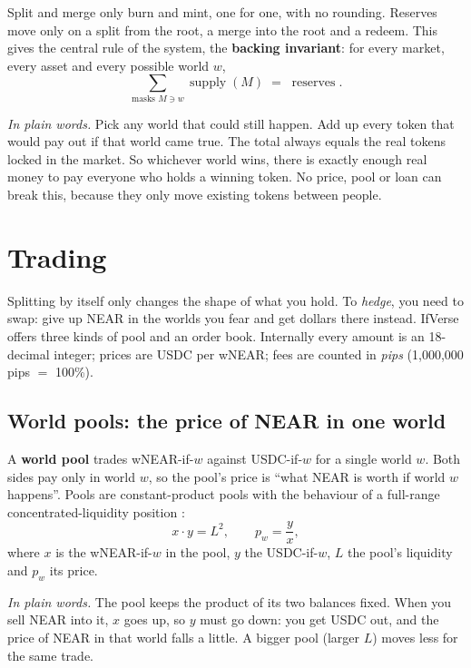 \documentclass[11pt,a4paper]{article}
\newcommand{\inwords}[1]{\par\noindent\colorbox{note}{\parbox{\dimexpr\linewidth-2\fboxsep}{\small\textit{In plain words.} #1}}\par}
\begin{document}
Split and merge only burn and mint, one for one, with no rounding. Reserves move only on a split from the root, a
merge into the root and a redeem. This gives the central rule of the system, the \textbf{backing invariant}: for
every market, every asset and every possible world $w$,
\begin{equation}
  \sum_{\text{masks } M \ni w} \operatorname{supply}(M) \;=\; \operatorname{reserves}.
  \label{eq:backing}
\end{equation}
\inwords{Pick any world that could still happen. Add up every token that would pay out if that world came true.
The total always equals the real tokens locked in the market. So whichever world wins, there is exactly enough real
money to pay everyone who holds a winning token. No price, pool or loan can break this, because they only move
existing tokens between people.}

\section{Trading}
\label{sec:trading}

Splitting by itself only changes the shape of what you hold. To \emph{hedge}, you need to swap: give up NEAR in the
worlds you fear and get dollars there instead. IfVerse offers three kinds of pool and an order book. Internally every
amount is an 18-decimal integer; prices are USDC per wNEAR; fees are counted in \emph{pips}
(1,000,000 pips $=$ 100\%).

\subsection{World pools: the price of NEAR in one world}

A \textbf{world pool} trades wNEAR-if-$w$ against USDC-if-$w$ for a single world $w$. Both sides pay only in world
$w$, so the pool's price is ``what NEAR is worth if world $w$ happens''. Pools are constant-product pools with the
behaviour of a full-range concentrated-liquidity position \cite{uniswapv3}:
\begin{equation}
  x \cdot y = L^2, \qquad p_w = \frac{y}{x},
  \label{eq:cpmm}
\end{equation}
where $x$ is the wNEAR-if-$w$ in the pool, $y$ the USDC-if-$w$, $L$ the pool's liquidity and $p_w$ its price.
\inwords{The pool keeps the product of its two balances fixed. When you sell NEAR into it, $x$ goes up, so $y$ must go
down: you get USDC out, and the price of NEAR in that world falls a little. A bigger pool (larger $L$) moves less for
the same trade.}
\end{document}

